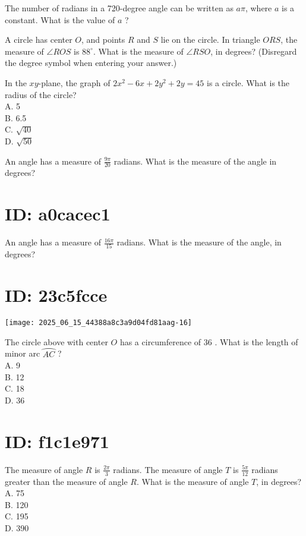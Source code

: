 
The number of radians in a 720-degree angle can be written as $a \pi$, where $a$ is a constant. What is the value of $a$ ?

A circle has center $O$, and points $R$ and $S$ lie on the circle. In triangle $O R S$, the measure of $\angle R O S$ is $88^{\circ}$. What is the measure of $\angle R S O$, in degrees? (Disregard the degree symbol when entering your answer.)

In the $x y$-plane, the graph of $2 x^{2}-6 x+2 y^{2}+2 y=45$ is a circle. What is the radius of the circle?\\
A. 5\\
B. 6.5\\
C. $\sqrt{40}$\\
D. $\sqrt{50}$

An angle has a measure of $\frac{9 \pi}{20}$ radians. What is the measure of the angle in degrees?

\section*{ID: a0cacec1}
An angle has a measure of $\frac{16 \pi}{15}$ radians. What is the measure of the angle, in degrees?

\section*{ID: 23c5fcce}
\begin{center}
\texttt{[image: 2025\_06\_15\_44388a8c3a9d04fd81aag-16]}
\end{center}

The circle above with center $O$ has a circumference of 36 . What is the length of minor arc $\wideparen{A C}$ ?\\
A. 9\\
B. 12\\
C. 18\\
D. 36

\section*{ID: f1c1e971}
The measure of angle $R$ is $\frac{2 \pi}{3}$ radians. The measure of angle $T$ is $\frac{5 \pi}{12}$ radians greater than the measure of angle $R$. What is the measure of angle $T$, in degrees?\\
A. 75\\
B. 120\\
C. 195\\
D. 390

